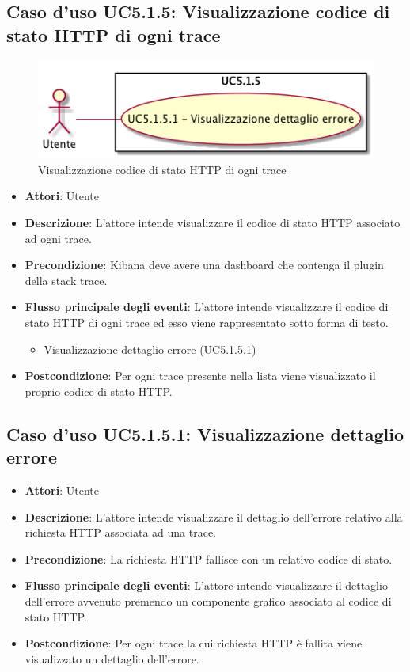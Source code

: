 \subsection{Caso d'uso UC5.1.5: Visualizzazione codice di stato HTTP di ogni trace}
\begin{figure} [H]
	\centering
	\includegraphics[scale=0.45]{./UC/UC5-1-5.png}
	\caption{Visualizzazione codice di stato HTTP di ogni trace}\label{}
\end{figure}
\begin{itemize}
	\item \textbf{Attori}: Utente
	\item \textbf{Descrizione}: L'attore intende visualizzare il codice di stato HTTP associato ad ogni trace.
	\item \textbf{Precondizione}: Kibana deve avere una dashboard che contenga il plugin della stack trace.
	\item \textbf{Flusso principale degli eventi}: L'attore intende visualizzare il codice di stato HTTP di ogni trace ed esso viene rappresentato sotto forma di testo.
	\begin{itemize}
		\item Visualizzazione dettaglio errore (UC5.1.5.1)
	\end{itemize}
	\item \textbf{Postcondizione}: Per ogni trace presente nella lista viene visualizzato il proprio codice di stato HTTP.
\end{itemize}
\subsection{Caso d'uso UC5.1.5.1: Visualizzazione dettaglio errore}
\begin{itemize}
	\item \textbf{Attori}: Utente
	\item \textbf{Descrizione}: L'attore intende visualizzare il dettaglio dell'errore relativo alla richiesta HTTP associata ad una trace.
	\item \textbf{Precondizione}: La richiesta HTTP fallisce con un relativo codice di stato.
	\item \textbf{Flusso principale degli eventi}: L'attore intende visualizzare il dettaglio dell'errore avvenuto premendo un componente grafico associato al codice di stato HTTP.
	
	\item \textbf{Postcondizione}: Per ogni trace la cui richiesta HTTP è fallita viene visualizzato un dettaglio dell'errore.
\end{itemize}

